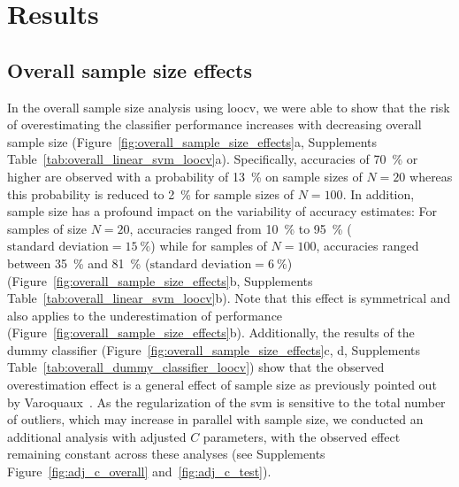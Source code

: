 \documentclass[12pt,a4paper]{article}
\begin{document}
    \section{Results}

    \subsection{Overall sample size effects}
    In the overall sample size analysis using \ac{loocv}, we were able to show that the risk of overestimating the classifier performance increases with decreasing overall sample size (Figure~\ref{fig:overall_sample_size_effects}a, Supplements Table~\ref{tab:overall_linear_svm_loocv}a). Specifically, accuracies of \SI{70}{\percent} or higher are observed with a probability of \SI{13}{\percent} on sample sizes of $N=20$ whereas this probability is reduced to \SI{2}{\percent} for sample sizes of $N=100$. In addition, sample size has a profound impact on the variability of accuracy estimates: For samples of size $N=20$, accuracies ranged from \SI{10}{\percent} to \SI{95}{\percent} ($\text{standard deviation}=\SI{15}{\percent}$) while for samples of $N=100$, accuracies ranged between \SI{35}{\percent} and \SI{81}{\percent} ($\text{standard deviation}=\SI{6}{\percent}$) (Figure~\ref{fig:overall_sample_size_effects}b, Supplements Table~\ref{tab:overall_linear_svm_loocv}b). Note that this effect is symmetrical and also applies to the underestimation of performance (Figure~\ref{fig:overall_sample_size_effects}b). Additionally, the results of the dummy classifier (Figure~\ref{fig:overall_sample_size_effects}c, d, Supplements Table~\ref{tab:overall_dummy_classifier_loocv}) show that the observed overestimation effect is a general effect of sample size as previously pointed out by Varoquaux~\cite{Varoquaux2018}. As the regularization of the \ac{svm} is sensitive to the total number of outliers, which may increase in parallel with sample size, we conducted an additional analysis with adjusted $C$ parameters, with the observed effect remaining constant across these analyses (see Supplements Figure~\ref{fig:adj_c_overall} and~\ref{fig:adj_c_test}).
\end{document}
